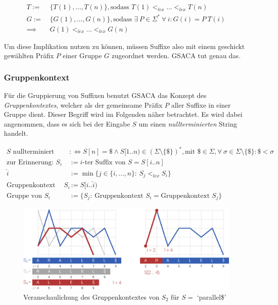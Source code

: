 \documentclass[twoside,11pt]{article}
\theoremstyle{break}
\begin{document}
\begin{align*}
	T :=\ &\{ T(1), \dots, T(n) \}, \text{sodass } T(1) <_{lex} \dots <_{lex} T(n) \\
	G :=\ &\{ G(1), \dots, G(n) \}, \text{sodass } \exists\ P \in \Sigma^*\ \forall\ i: G(i) = P\ T(i) \\
	\implies &G(1) <_{lex} \dots <_{lex} G(n)
\end{align*}

Um diese Implikation nutzen zu können, müssen Suffixe also mit einem geschickt gewählten Präfix $P$ einer Gruppe $G$ zugeordnet werden. GSACA tut genau das.

\subsubsection{Gruppenkontext}

Für die Gruppierung von Suffixen benutzt GSACA das Konzept des \textit{Gruppenkontextes}, welcher als der gemeinsame Präfix $P$ aller Suffixe in einer Gruppe dient. Dieser Begriff wird im Folgenden näher betrachtet. Es wird dabei angenommen, dass es sich bei der Eingabe $S$ um einen \textit{nullterminierten} String handelt.

\begin{align*}
	S \text{ nullterminiert} &:\Leftrightarrow S[n] = \$ \land S[1..n) \in (\Sigma \setminus \{\$\})^*, \text{mit } \$ \in \Sigma, \forall\ \sigma \in \Sigma \setminus \{\$\}: \$ < \sigma \\
	\text{zur Erinnerung: } S_i &:= \text{$i$-ter Suffix von $S$} = S[i .. n] \\
	\widehat{i} &:= \min \{ j \in \{ i, \dots, n \}:\ S_j <_{lex} S_i \} \\
	\text{Gruppenkontext von } S_i &:= S[i .. \widehat{i}) \\
	\text{Gruppe von } S_i &:= \{ S_j:\ \text{Gruppenkontext } S_i = \text{Gruppenkontext } S_j \}
\end{align*}

\begin{figure}[h]
	\centering
	\includegraphics[width=\linewidth,bb=0 0 1316 522]{./assets/groupContext.pdf}
	\caption{Veranschaulichung des Gruppenkontextes von $S_2$ für $S =$ `parallel\$'}
\label{fig:groupContext}
\end{figure}
\end{document}
